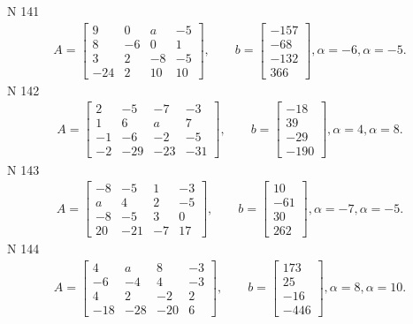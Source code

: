 \documentclass[11pt]{report}
\begin{document}
N 141
\begin{align*}
 A = \left[\begin{matrix}9 & 0 & a & -5\\8 & -6 & 0 & 1\\3 & 2 & -8 & -5\\-24 & 2 & 10 & 10\end{matrix}\right],
    \qquad b = \left[\begin{matrix}-157\\-68\\-132\\366\end{matrix}\right], \alpha = -6, \alpha = -5. 
 \end{align*}
N 142
\begin{align*}
 A = \left[\begin{matrix}2 & -5 & -7 & -3\\1 & 6 & a & 7\\-1 & -6 & -2 & -5\\-2 & -29 & -23 & -31\end{matrix}\right],
    \qquad b = \left[\begin{matrix}-18\\39\\-29\\-190\end{matrix}\right], \alpha = 4, \alpha = 8. 
 \end{align*}
N 143
\begin{align*}
 A = \left[\begin{matrix}-8 & -5 & 1 & -3\\a & 4 & 2 & -5\\-8 & -5 & 3 & 0\\20 & -21 & -7 & 17\end{matrix}\right],
    \qquad b = \left[\begin{matrix}10\\-61\\30\\262\end{matrix}\right], \alpha = -7, \alpha = -5. 
 \end{align*}
N 144
\begin{align*}
 A = \left[\begin{matrix}4 & a & 8 & -3\\-6 & -4 & 4 & -3\\4 & 2 & -2 & 2\\-18 & -28 & -20 & 6\end{matrix}\right],
    \qquad b = \left[\begin{matrix}173\\25\\-16\\-446\end{matrix}\right], \alpha = 8, \alpha = 10. 
 \end{align*}
\end{document}
